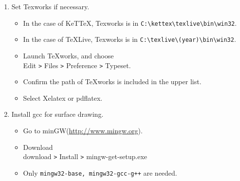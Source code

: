 \documentclass{article}
\begin{document}
\begin{enumerate}[\bf\large 1.]
\item Set Texworks if necessary.
  \begin{itemize}
  \item In the case of KeTTeX, Texworks is in \verb|C:\kettex\texlive\bin\win32|.
  \item In the case of TeXLive, Texworks is in \verb|C:\texlive\(year)\bin\win32|.
  \item Launch TeXworks, and choose\\
  \hspace*{10mm}Edit \verb|>| Files \verb|>| Preference \verb|>| Typeset.
  \item Confirm the path of TeXworks is included in the upper list.
  \item Select Xelatex or pdflatex.
  \end{itemize}

\item Install gcc for surface drawing.
  \begin{itemize}
  \item Go to  minGW(\url{http://www.mingw.org}).
  \item Download\\
  \hspace*{10mm}download \verb|>| Install \verb|>| mingw-get-setup.exe
  \item Only \verb|mingw32-base, mingw32-gcc-g++| are needed.
  \end{itemize}

\end{enumerate}
\end{document}
